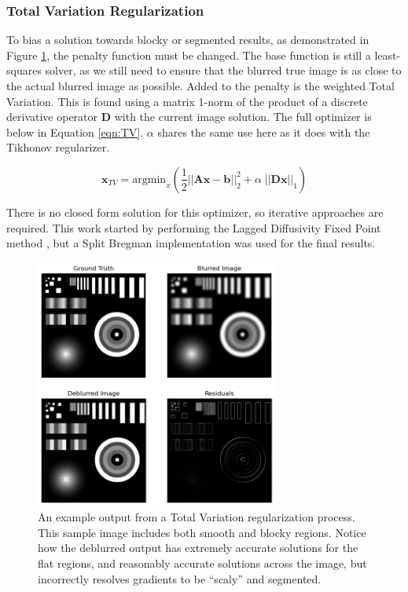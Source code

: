 \documentclass[letterpaper, 11pt, titlepage, twocolumn]{article}
\begin{document}
\subsubsection{Total Variation Regularization}
To bias a solution towards blocky or segmented results, as demonstrated in Figure \ref{fig:tv_demo}, the penalty function must be changed. The base function is still a least-squares solver, as we still need to ensure that the blurred true image is as close to the actual blurred image as possible. Added to the penalty is the weighted Total Variation. This is found using a matrix 1-norm of the product of a discrete derivative operator \textbf{D} with the current image solution. The full optimizer is below in Equation \eqref{eqn:TV}. $\alpha$ shares the same use here as it does with the Tikhonov regularizer.

\begin{equation}
  \label{eqn:TV}
  \mathbf{x}_{TV}=\textrm{argmin}_x\left(\frac{1}{2}||\mathbf{Ax}-\mathbf{b}||^2_2 + \alpha\; ||\mathbf{Dx}||_1\right)
\end{equation}

There is no closed form solution for this optimizer, so iterative approaches are required. This work started by performing the Lagged Diffusivity Fixed Point method \cite{vogel_computational_2002}, but a Split Bregman implementation was used for the final results. \cite{getreuer_total_2012}

\begin{figure}[H]
  \centering
  \includegraphics[width=8cm]{demo_tv.png}
  \caption{An example output from a Total Variation regularization process. This sample image includes both smooth and blocky regions. Notice how the deblurred output has extremely accurate solutions for the flat regions, and reasonably accurate solutions across the image, but incorrectly resolves gradients to be ``scaly'' and segmented.}
  \label{fig:tv_demo}
\end{figure}
\end{document}
